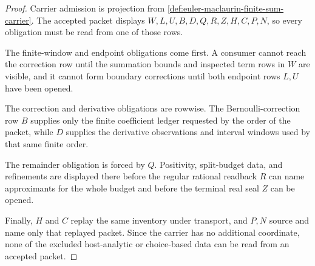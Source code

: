 \begin{proof}
Carrier admission is projection from \autoref{def:euler-maclaurin-finite-sum-carrier}. The accepted packet displays $W,L,U,B,D,Q,R,Z,H,C,P,N$, so every obligation must be read from one of those rows.

The finite-window and endpoint obligations come first. A consumer cannot reach the correction row until the summation bounds and inspected term rows in $W$ are visible, and it cannot form boundary corrections until both endpoint rows $L,U$ have been opened.

The correction and derivative obligations are rowwise. The Bernoulli-correction row $B$ supplies only the finite coefficient ledger requested by the order of the packet, while $D$ supplies the derivative observations and interval windows used by that same finite order.

The remainder obligation is forced by $Q$. Positivity, split-budget data, and refinements are displayed there before the regular rational readback $R$ can name approximants for the whole budget and before the terminal real seal $Z$ can be opened.

Finally, $H$ and $C$ replay the same inventory under transport, and $P,N$ source and name only that replayed packet. Since the carrier has no additional coordinate, none of the excluded host-analytic or choice-based data can be read from an accepted packet.
\end{proof}

